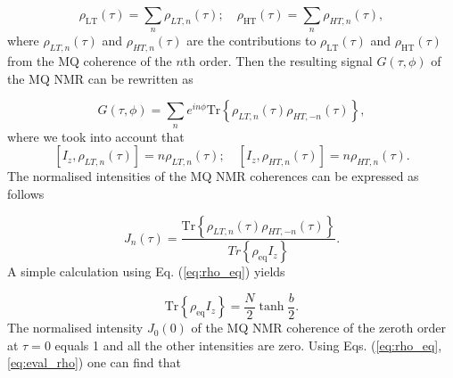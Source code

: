 \documentclass[
    pra,  
    twocolumn, 
    floatfix, 
    amsmath, 
    amssymb, 
    superscriptaddress
]{revtex4-1}
\begin{document}
\begin{equation}
    \label{eq:rho_series}
    \rho_\mathrm{LT} (\tau) = \sum_n \rho_{LT, n}(\tau); \quad
    \rho_\mathrm{HT} (\tau) = \sum_n \rho_{HT, n}(\tau),
\end{equation}
where $\rho_{LT, n} (\tau)$ and $\rho_{HT, n} (\tau)$ are the contributions to $\rho_\mathrm{LT} (\tau)$ and $\rho_\mathrm{HT} (\tau)$ from the MQ coherence of the $n$th order. Then the resulting signal $G(\tau, \phi)$ of the MQ NMR \cite{mq_nmr_experiment} can be rewritten as 

\begin{equation}
    \label{eq:signal_series}
    G(\tau, \phi) = \sum\limits_n 
    e^{in\phi}\mathrm{Tr} \left\{
    \rho_{LT, n}(\tau) \rho_{HT, -n} (\tau)
    \right\},
\end{equation}
where we took into account that
\begin{equation}
    \left[I_z, \rho_{LT, n} (\tau) \right] = n  \rho_{LT, n} (\tau);
    \quad 
    \left[I_z, \rho_{HT, n} (\tau) \right] = n  \rho_{HT, n} (\tau).
\end{equation}
The normalised intensities of the MQ NMR coherences can be expressed as follows 

\begin{equation}
    \label{eq:coherence}
    J_n(\tau) = 
    \dfrac{
       \mathrm{Tr} \left\{
        \rho_{LT, n}(\tau) \rho_{HT, -n} (\tau)
        \right\}
    }{Tr \left\{\rho_{\mathrm{eq}}I_z\right\}}.
\end{equation}
A simple calculation using Eq.   (\ref{eq:rho_eq}) yields \cite{lab:low_temp_dyn_1997}

\begin{equation}
   \mathrm{Tr} \left\{\rho_{\mathrm{eq}}I_z\right\} = 
    \frac N 2 \tanh \frac b 2.
\end{equation}
The normalised intensity $J_0(0)$ of the MQ NMR coherence of the zeroth order at $\tau=0$ equals 1 and all the other intensities are zero. Using Eqs.   (\ref{eq:rho_eq}, \ref{eq:eval_rho}) one can find that
\end{document}
